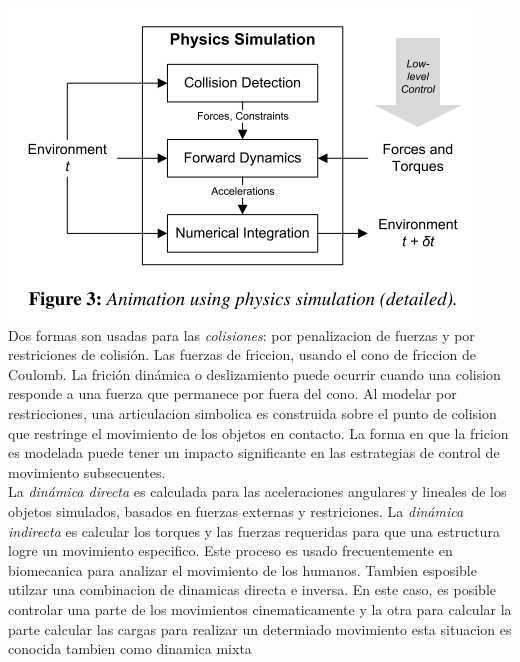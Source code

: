 \documentclass[10pt,onecolumn,twoside,letterpaper]{article}
\begin{document}
\includegraphics[scale=0.4]{../../images/PhysicsSimulationDetailed.png}\cite{Geijtenbeek2011}\\
Dos formas son usadas para las \emph{colisiones}: por penalizacion de fuerzas y por restriciones de colisi\'on. Las fuerzas de friccion, usando el cono de friccion de Coulomb. La frici\'on din\'amica o deslizamiento puede ocurrir cuando una colision responde a una fuerza que permanece por fuera del cono. Al modelar por restricciones, una articulacion simbolica es construida sobre el punto de colision que restringe el movimiento de los objetos en contacto. La forma en que la fricion es modelada puede tener un impacto significante en las estrategias de control de movimiento subsecuentes.\cite{Geijtenbeek2011}\\
La \emph{din\'amica directa} es calculada para las aceleraciones angulares y lineales de los objetos simulados, basados en fuerzas externas y restriciones. La \emph{din\'amica indirecta} es calcular los torques y las fuerzas requeridas para que una estructura logre un movimiento especifico. Este proceso es usado frecuentemente en biomecanica para analizar el movimiento de los humanos. Tambien esposible utilzar una combinacion de dinamicas directa e inversa. En este caso, es posible controlar una parte de los movimientos cinematicamente y la otra para calcular la parte calcular las cargas para realizar un determiado movimiento esta situacion es conocida tambien como dinamica mixta
\end{document}
